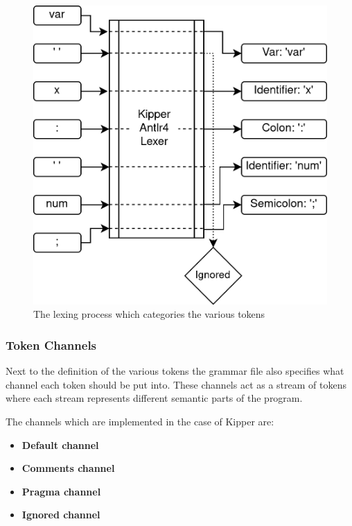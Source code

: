 \begin{figure}[h!]
	\centering
	\includegraphics[scale=1]{./pics/Lexer-Algorithm.drawio}
	\caption{The lexing process which categories the various tokens}
	\label{fig:implementation:Lexer-Algorithm}
\end{figure}

\subsubsection{Token Channels}
\label{sec:token-channels}

Next to the definition of the various tokens the grammar file also specifies what channel each token should be put into. These channels act as a stream of tokens where each stream represents different semantic parts of the program.

The channels which are implemented in the case of Kipper are:

\begin{itemize}
	\item \textbf{Default channel}
	\item \textbf{Comments channel}
	\item \textbf{Pragma channel}
	\item \textbf{Ignored channel}
\end{itemize}

